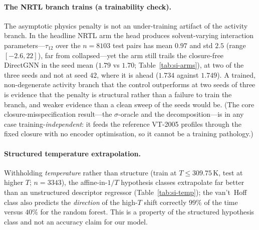 \paragraph{The NRTL branch trains (a trainability check).} The asymptotic physics penalty is not an
under-training artifact of the activity branch. In the headline NRTL arm the head produces
solvent-varying interaction parameters---$\tau_{12}$ over the $n{=}8103$ test pairs has mean
$0.97$ and std $2.5$ (range $[-2.6,22]$), far from collapsed---yet the arm still trails the
closure-free DirectGNN in the seed mean ($1.79$ vs $1.70$; Table~\ref{tab:si-arms}), at two of the
three seeds and not at seed $42$, where it is ahead ($1.734$ against $1.749$). A trained,
non-degenerate activity branch that the control outperforms at two seeds of three is evidence that
the penalty is structural rather than a failure to train the branch, and weaker evidence than a
clean sweep of the seeds would be.
(The core closure-misspecification result---the $\sigma$-oracle and the decomposition---is in
any case training-\emph{independent}: it feeds the reference VT-2005 profiles through the fixed
closure with no encoder optimisation, so it cannot be a training pathology.)

\paragraph{Structured temperature extrapolation.} Withholding \emph{temperature} rather
than structure (train at $T\le309.75$\,K, test at higher $T$; $n=3343$), the
affine-in-$1/T$ hypothesis classes extrapolate far better than an unstructured
descriptor regressor (Table~\ref{tab:si-temp}); the van't~Hoff class also predicts the
\emph{direction} of the high-$T$ shift correctly $99\%$ of the time versus $40\%$ for
the random forest. This is a property of the structured hypothesis class and not an
accuracy claim for our model.

